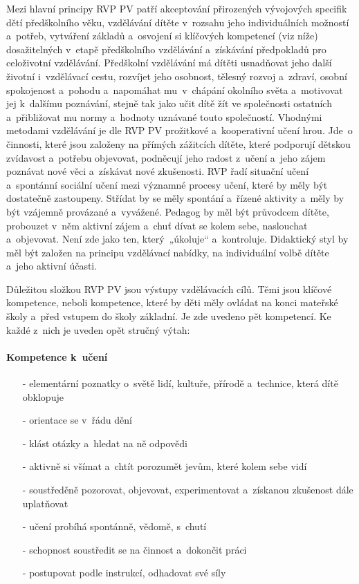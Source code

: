 				Mezi hlavní principy RVP PV patří akceptování přirozených vývojových specifik dětí předškolního věku, vzdělávání dítěte v rozsahu jeho individuálních možností a~potřeb, vytváření základů a~osvojení si klíčových kompetencí (viz níže) dosažitelných v etapě předškolního vzdělávání a~získávání předpokladů pro celoživotní vzdělávání.
				Předškolní vzdělávání má dítěti usnadňovat jeho další životní i~vzdělávací cestu, rozvíjet jeho osobnost, tělesný rozvoj a~zdraví, osobní spokojenost a~pohodu a~napomáhat mu v chápání okolního světa a~motivovat jej k dalšímu poznávání, stejně tak jako učit dítě žít ve společnosti ostatních a~přibližovat mu normy a~hodnoty uznávané touto společností.
				Vhodnými metodami vzdělávání je dle RVP PV prožitkové a~kooperativní učení hrou. Jde o činnosti, které jsou založeny na přímých zážitcích dítěte, které podporují dětskou zvídavost a~potřebu objevovat, podněcují jeho radost z učení a~jeho zájem poznávat nové věci a~získávat nové zkušenosti.
				RVP řadí situační učení a~spontánní sociální učení mezi významné procesy učení, které by měly být dostatečně zastoupeny. Střídat by se měly spontání a~řízené aktivity a~měly by být vzájemně provázané a~vyvážené. Pedagog by měl být průvodcem dítěte, probouzet v něm aktivní zájem a~chuť dívat se kolem sebe, naslouchat a~objevovat. Není zde jako ten, který „úkoluje“ a~kontroluje. Didaktický styl by měl být založen na principu vzdělávací nabídky, na individuální volbě dítěte a~jeho aktivní účasti.
				

				Důležitou složkou RVP PV jsou výstupy vzdělávacích cílů. Těmi jsou klíčové kompetence, neboli kompetence, které by děti měly ovládat na konci mateřské školy a~před vstupem do školy základní. Je zde uvedeno pět kompetencí. Ke každé z nich je uveden opět stručný výtah:

				\paragraph{Kompetence k učení}
				\begin{itemize}
				\setlength\itemsep{-2mm}
				\item[-] elementární poznatky o~světě lidí, kultuře, přírodě a~technice, která dítě obklopuje
				\item[-] orientace se v řádu dění
				\item[-] klást otázky a~hledat na ně odpovědi
				\item[-] aktivně si všímat a~chtít porozumět jevům, které kolem sebe vidí
				\item[-] soustředěně pozorovat, objevovat, experimentovat a získanou zkušenost dále uplatňovat
				\item[-] učení probíhá spontánně, vědomě, s~chutí
				\item[-] schopnost soustředit se na činnost a~dokončit práci
				\item[-] postupovat podle instrukcí, odhadovat své síly 
				\end{itemize}
				

